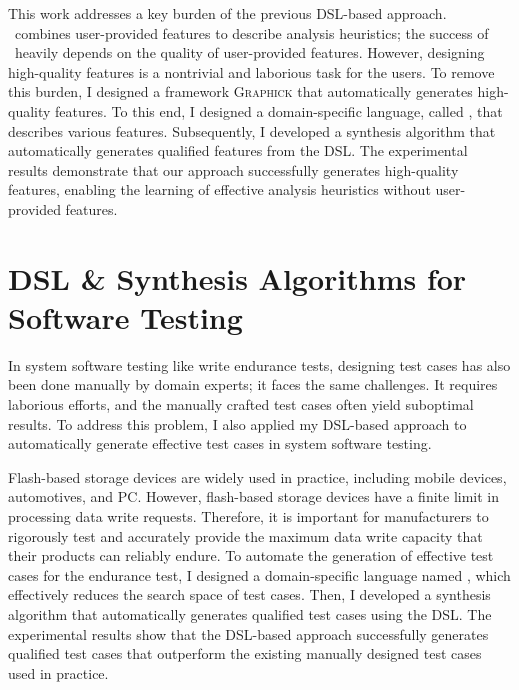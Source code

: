 \documentclass[11pt]{article}
\newcommand{\myparagraph}[1]{\medskip\noindent{\it \textbf{#1.}}}
\begin{document}
\myparagraph{Graphick~\cite{Jeon20}}
%
This work addresses a key burden of the previous DSL-based approach. 
%
\DisjunctiveModel~combines user-provided features to describe analysis heuristics; the success of \DisjunctiveModel~heavily depends on the quality of user-provided features.
%
However, designing high-quality features is a nontrivial and laborious task for the users.
%
To remove this burden, I designed a framework \textsc{Graphick} that automatically generates high-quality features.
%
To this end, I designed a domain-specific language, called \FeatureLanguage, that describes various features.
%
Subsequently, I developed a synthesis algorithm that automatically generates qualified features from the DSL.
%
The experimental results demonstrate that our approach successfully generates high-quality features, enabling the learning of effective analysis heuristics without user-provided features.




\section{DSL \& Synthesis Algorithms for Software Testing}
%
In system software testing like write endurance tests, designing test cases has also been done manually by domain experts; it faces the same challenges.
It requires laborious efforts, and the manually crafted test cases often yield suboptimal results.
%
To address this problem, I also applied my DSL-based approach to automatically generate effective test cases in system software testing.




\myparagraph{ARES~\cite{ARES23}}
%
Flash-based storage devices are widely used in practice, including mobile devices, automotives, and PC. 
%
However, flash-based storage devices have a finite limit in processing data write requests.
%
Therefore, it is important for manufacturers to rigorously test and accurately provide the maximum data write capacity that their products can reliably endure.
%
To automate the generation of effective test cases for the endurance test, I designed a domain-specific language named \AbstractRelativeWritePattern, which effectively reduces the search space of test cases.
%
Then, I developed a synthesis algorithm that automatically generates qualified test cases using the DSL.
%
The experimental results show that the DSL-based approach successfully generates qualified test cases that outperform the existing manually designed test cases used in practice.
\end{document}
